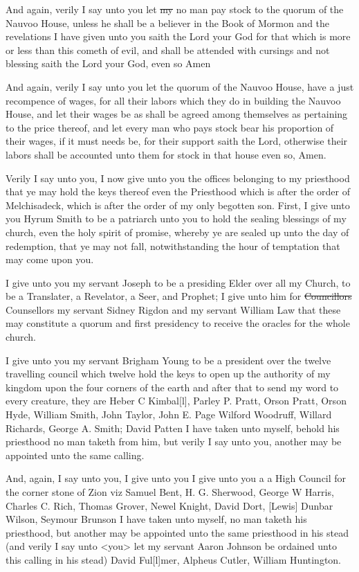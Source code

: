 				And again, verily I say unto you let \sout{my} no man pay stock to the quorum of the Nauvoo House, unless he shall be a believer in the Book of Mormon and the revelations I have given unto you saith the Lord your God for that which is more or less than this cometh of evil, and shall be attended with cursings and not blessing saith the Lord your God, even so Amen

				And again, verily I say unto you let the quorum of the Nauvoo House, have a just recompence of wages, for all their labors which they do in building the Nauvoo House, and let their wages be as shall be agreed among themselves as pertaining to the price thereof, and let every man who pays stock bear his proportion of their wages, if it must needs be, for their support saith the Lord, otherwise their labors shall be accounted unto them for stock in that house even so, Amen.

				Verily I say unto you, I now give unto you the offices belonging to my priesthood that ye may hold the keys thereof even the Priesthood which is after the order of Melchisadeck, which is after the order of my only begotten son. First, I give unto you Hyrum Smith to be a patriarch unto you to hold the sealing blessings of my church, even the holy spirit of promise, whereby ye are sealed up unto the day of redemption, that ye may not fall, notwithstanding the hour of temptation that may come upon you.

				I give unto you my servant Joseph to be a presiding Elder over all my Church, to be a Translater, a Revelator, a Seer, and Prophet; I give unto him for \sout{Councillors} Counsellors my servant Sidney Rigdon and my servant William Law that these may constitute a quorum and first presidency to receive the oracles for the whole church.

				I give unto you my servant Brigham Young to be a president over the twelve travelling council which twelve hold the keys to open up the authority of my kingdom upon the four corners of the earth and after that to send my word to every creature, they are Heber C Kimbal[l], Parley P. Pratt, Orson Pratt, Orson Hyde, William Smith, John Taylor, John E. Page Wilford Woodruff, Willard Richards, George A. Smith; David Patten I have taken unto myself, behold his priesthood no man taketh from him, but verily I say unto you, another may be appointed unto the same calling.

				And, again, I say unto you, I give unto you I give unto you a a High Council for the corner stone of Zion viz Samuel Bent, H. G. Sherwood, George W Harris, Charles C. Rich, Thomas Grover, Newel Knight, David Dort, [Lewis] Dunbar Wilson, Seymour Brunson I have taken unto myself, no man taketh his priesthood, but another may be appointed unto the same priesthood in his stead (and verily I say unto <you> let my servant Aaron Johnson be ordained unto this calling in his stead) David Ful[l]mer, Alpheus Cutler, William Huntington.

